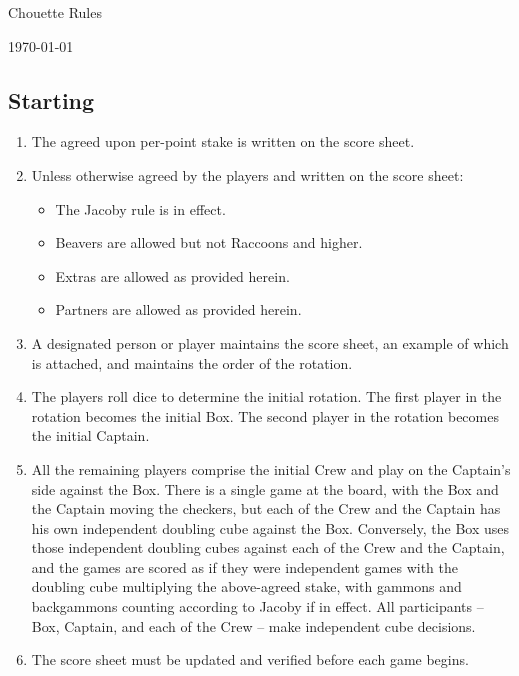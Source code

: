 \documentclass[11pt]{article}
\begin{document}
\begin{center}
\LARGE Chouette Rules
\end{center}

\begin{center}
  \today
\end{center}

\subsection*{Starting}

\begin{enumerate}

\item The agreed upon per-point stake is written on the score sheet.

\item Unless otherwise agreed by the players and written on the score sheet:
  \begin{itemize}
    \item The Jacoby rule is in effect.
      
    \item Beavers are allowed but not Raccoons and higher.
      
    \item Extras are allowed as provided herein.
      
    \item Partners are allowed as provided herein.
  \end{itemize}

\item A designated person or player maintains the score sheet, an example of
  which is attached, and maintains the order of the rotation.

\item The players roll dice to determine the initial rotation.
The first player in the rotation becomes the initial Box.
The second player in the rotation becomes the initial Captain.

\item All the remaining players comprise the initial Crew and play on the
  Captain's side against the Box.  There is a single game at the board,
  with the Box and the Captain moving the checkers, but each of the Crew
  and the Captain has his own independent doubling cube against the Box.
  Conversely, the Box uses those independent doubling cubes against each
  of the Crew and the Captain, and the games are scored as if they were
  independent games with the doubling cube multiplying the above-agreed
  stake, with gammons and backgammons counting according to Jacoby if in
  effect.  All participants -- Box, Captain, and each of the Crew -- make
  independent cube decisions.

\item The score sheet must be updated and verified before each game begins.


\end{enumerate}
\end{document}
